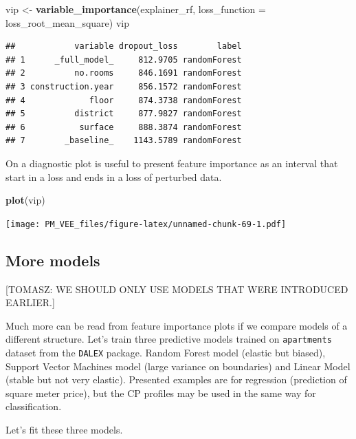 \documentclass[12pt,]{krantz}
\newenvironment{Shaded}{\begin{snugshade}}{\end{snugshade}}
\newcommand{\DataTypeTok}[1]{\textcolor[rgb]{0.13,0.29,0.53}{#1}}
\newcommand{\KeywordTok}[1]{\textcolor[rgb]{0.13,0.29,0.53}{\textbf{#1}}}
\newcommand{\NormalTok}[1]{#1}
\newcommand{\StringTok}[1]{\textcolor[rgb]{0.31,0.60,0.02}{#1}}
\begin{document}
\begin{Shaded}
\begin{Highlighting}[]
\NormalTok{vip <-}\StringTok{ }\KeywordTok{variable_importance}\NormalTok{(explainer_rf, }
            \DataTypeTok{loss_function =}\NormalTok{ loss_root_mean_square)}
\NormalTok{vip}
\end{Highlighting}
\end{Shaded}

\begin{verbatim}
##            variable dropout_loss        label
## 1      _full_model_     812.9705 randomForest
## 2          no.rooms     846.1691 randomForest
## 3 construction.year     856.1572 randomForest
## 4             floor     874.3738 randomForest
## 5          district     877.9827 randomForest
## 6           surface     888.3874 randomForest
## 7        _baseline_    1143.5789 randomForest
\end{verbatim}

On a diagnostic plot is useful to present feature importance as an interval that start in a loss and ends in a loss of perturbed data.

\begin{Shaded}
\begin{Highlighting}[]
\KeywordTok{plot}\NormalTok{(vip)}
\end{Highlighting}
\end{Shaded}

\texttt{[image: PM\_VEE\_files/figure-latex/unnamed-chunk-69-1.pdf]}

\hypertarget{more-models}{%
\subsection{More models}\label{more-models}}

{[}TOMASZ: WE SHOULD ONLY USE MODELS THAT WERE INTRODUCED EARLIER.{]}

Much more can be read from feature importance plots if we compare models of a different structure.
Let's train three predictive models trained on \texttt{apartments} dataset from the \texttt{DALEX} package. Random Forest model \citep{R-randomForest} (elastic but biased), Support Vector Machines model \citep{R-e1071} (large variance on boundaries) and Linear Model (stable but not very elastic).
Presented examples are for regression (prediction of square meter price), but the CP profiles may be used in the same way for classification.

Let's fit these three models.
\end{document}
